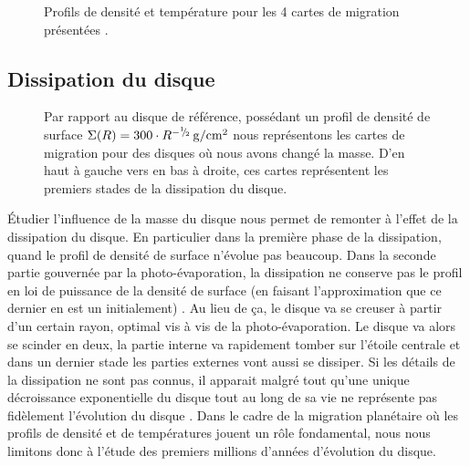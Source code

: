 \begin{figure}[htbp]
\centering
{}\hfill
{}

\caption{Profils de densité et température pour les 4 cartes de migration présentées
\protect{}.}\label{fig:index_profiles}
\end{figure}

\subsection{Dissipation du disque}

\begin{figure}[htbp]
\centering
{}\hfill
{}

\hfill
{}

\caption{Par rapport au disque de référence, possédant un profil de densité de surface $\Sigma(R) = 300 \cdot
R^{-{{}^{1\!\!}/ _{\!2}}}\mathrm{\thinspace g/cm^2}$ nous représentons les cartes de migration pour des disques où nous avons changé la masse. D'en haut à gauche vers en bas à droite, ces cartes représentent les premiers stades de la dissipation du disque. }\label{fig:map_total_mass}
\end{figure}

Étudier l'influence de la masse du disque nous permet de remonter à l'effet de la dissipation du disque. En particulier dans la
première phase de la dissipation, quand le profil de densité de surface n'évolue pas beaucoup. Dans la seconde partie gouvernée
par la photo-évaporation, la dissipation ne conserve pas le profil en loi de puissance de la densité de surface (en faisant
l'approximation que ce dernier en est un initialement) . Au lieu de ça, le
disque va se creuser à partir d'un certain rayon, optimal vis à vis de la photo-évaporation. Le disque va alors se scinder en
deux, la partie interne va rapidement tomber sur l'étoile centrale et dans un dernier stade les parties externes vont aussi se
dissiper. Si les détails de la dissipation ne sont pas connus, il apparait malgré tout qu'une unique décroissance exponentielle
du disque tout au long de sa vie ne représente pas fidèlement l'évolution du disque \citep{alexander2006photoevaporation}. Dans
le cadre de la migration planétaire où les profils de densité et de températures jouent un rôle fondamental, nous nous limitons
donc à l'étude des premiers millions d'années d'évolution du disque. 

